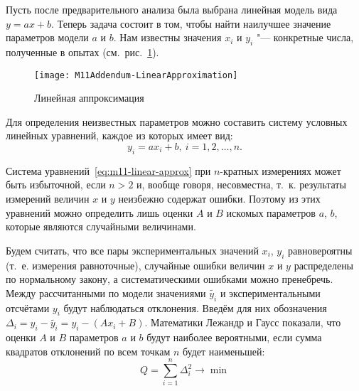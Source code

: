 \documentclass[a4paper, 12pt]{extarticle}
\newcommand{\isum}{\sum\limits_{i=1}^{n}}
\begin{document}
Пусть после предварительного анализа была выбрана линейная модель вида $y=ax + b$. Теперь задача состоит в том, чтобы найти наилучшее значение параметров модели $a$ и $b$. Нам известны значения $x_i$ и $y_i$ "--- конкретные числа, полученные в опытах (см.~рис.~\ref{fig:m11-linear-approx}).{

\begin{figure}[h]
\begin{center}
\texttt{[image: M11Addendum-LinearApproximation]}
\end{center}
\vspace{-14pt}
\caption{Линейная аппроксимация \label{fig:m11-linear-approx}}
\end{figure}

Для определения неизвестных параметров можно составить систему условных линейных уравнений, каждое из которых имеет вид: %
\begin{equation}
\label{eq:m11-linear-approx}
y_i = a x_i + b,\ i = 1, 2, \ldots, n. %
\end{equation}

Система уравнений~\eqref{eq:m11-linear-approx} при $n$-кратных измерениях может быть избыточной, если $n >2$ и, вообще говоря, несовместна, т.~к. результаты измерений величин $x$ и $y$ неизбежно содержат ошибки. Поэтому из этих уравнений можно определить лишь оценки $A$ и $B$ искомых параметров $a$, $b$, которые являются случайными величинами. %

Будем считать, что все пары экспериментальных значений $x_i$, $y_i$  равновероятны (т.~е. измерения равноточные), случайные ошибки величин $x$ и $y$ распределены по нормальному закону, а систематическими ошибками можно пренебречь. Между рассчитанными по модели значениями $\widetilde{y_i}$ и экспериментальными отсчётами $y_i$ будут наблюдаться отклонения. Введём для них обозначения $\Delta_i = y_i - \widetilde{y_i} = y_i - (A  x_i + B)$. %
Математики Лежандр и Гаусс показали, что оценки $A$ и $B$ параметров $a$ и $b$  будут наиболее вероятными, если сумма квадратов отклонений по всем точкам $n$ будет наименьшей: %
\begin{equation}
\label{eq:m11-error}
Q = \isum \Delta_i^2 \to \min
\end{equation}

}
\end{document}
